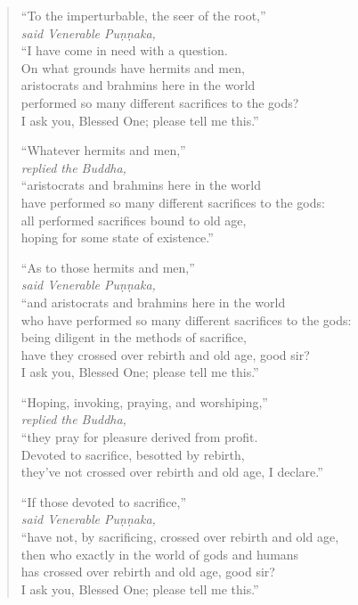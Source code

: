 \documentclass[12pt,openany]{book}%
\newcommand*{\scspeaker}[1]{\hspace{2em}\textit{#1}}
\begin{document}
\begin{verse}%
“To the imperturbable, the seer of the root,” \\
\scspeaker{said Venerable \textsanskrit{Puṇṇaka}, }\\
“I have come in need with a question. \\
On what grounds have hermits and men, \\
aristocrats and brahmins here in the world \\
performed so many different sacrifices to the gods? \\
I ask you, Blessed One; please tell me this.” 

“Whatever hermits and men,” \\
\scspeaker{replied the Buddha, }\\
“aristocrats and brahmins here in the world \\
have performed so many different sacrifices to the gods: \\
all performed sacrifices bound to old age, \\
hoping for some state of existence.” 

“As to those hermits and men,” \\
\scspeaker{said Venerable \textsanskrit{Puṇṇaka}, }\\
“and aristocrats and brahmins here in the world \\
who have performed so many different sacrifices to the gods: \\
being diligent in the methods of sacrifice, \\
have they crossed over rebirth and old age, good sir? \\
I ask you, Blessed One; please tell me this.” 

“Hoping, invoking, praying, and worshiping,” \\
\scspeaker{replied the Buddha, }\\
“they pray for pleasure derived from profit. \\
Devoted to sacrifice, besotted by rebirth, \\
they’ve not crossed over rebirth and old age, I declare.” 

“If those devoted to sacrifice,” \\
\scspeaker{said Venerable \textsanskrit{Puṇṇaka}, }\\
“have not, by sacrificing, crossed over rebirth and old age, \\
then who exactly in the world of gods and humans \\
has crossed over rebirth and old age, good sir? \\
I ask you, Blessed One; please tell me this.” 


\end{verse}
\end{document}
